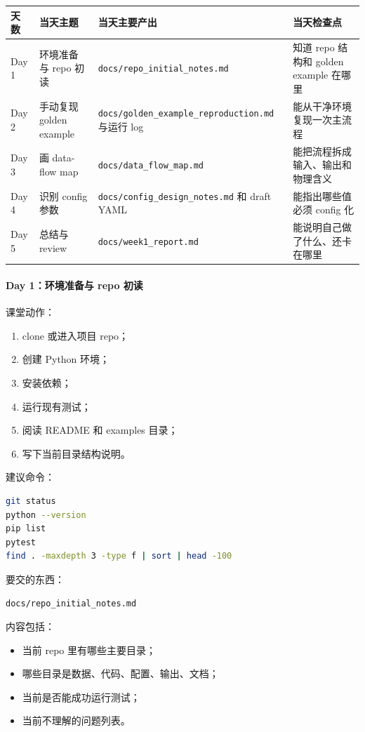 \documentclass[11pt,a4paper,fontset=fandol]{ctexart}
\begin{document}
\begin{longtable}{p{}p{}p{}p{}}
\toprule
天数 & 当天主题 & 当天主要产出 & 当天检查点 \\
\midrule
Day 1 & 环境准备与 repo 初读 & \texttt{docs/repo\_initial\_notes.md} & 知道 repo 结构和 golden example 在哪里 \\
Day 2 & 手动复现 golden example & \texttt{docs/golden\_example\_reproduction.md} 与运行 log & 能从干净环境复现一次主流程 \\
Day 3 & 画 data-flow map & \texttt{docs/data\_flow\_map.md} & 能把流程拆成输入、输出和物理含义 \\
Day 4 & 识别 config 参数 & \texttt{docs/config\_design\_notes.md} 和 draft YAML & 能指出哪些值必须 config 化 \\
Day 5 & 总结与 review & \texttt{docs/week1\_report.md} & 能说明自己做了什么、还卡在哪里 \\
\bottomrule
\end{longtable}

\paragraph{Day 1：环境准备与 repo 初读}

课堂动作：

\begin{enumerate}[leftmargin=2em]
  \item clone 或进入项目 repo；
  \item 创建 Python 环境；
  \item 安装依赖；
  \item 运行现有测试；
  \item 阅读 README 和 examples 目录；
  \item 写下当前目录结构说明。
\end{enumerate}

建议命令：

\begin{lstlisting}[language=bash]
git status
python --version
pip list
pytest
find . -maxdepth 3 -type f | sort | head -100
\end{lstlisting}

要交的东西：

\begin{lstlisting}
docs/repo_initial_notes.md
\end{lstlisting}

内容包括：

\begin{itemize}[leftmargin=2em]
  \item 当前 repo 里有哪些主要目录；
  \item 哪些目录是数据、代码、配置、输出、文档；
  \item 当前是否能成功运行测试；
  \item 当前不理解的问题列表。
\end{itemize}
\end{document}
